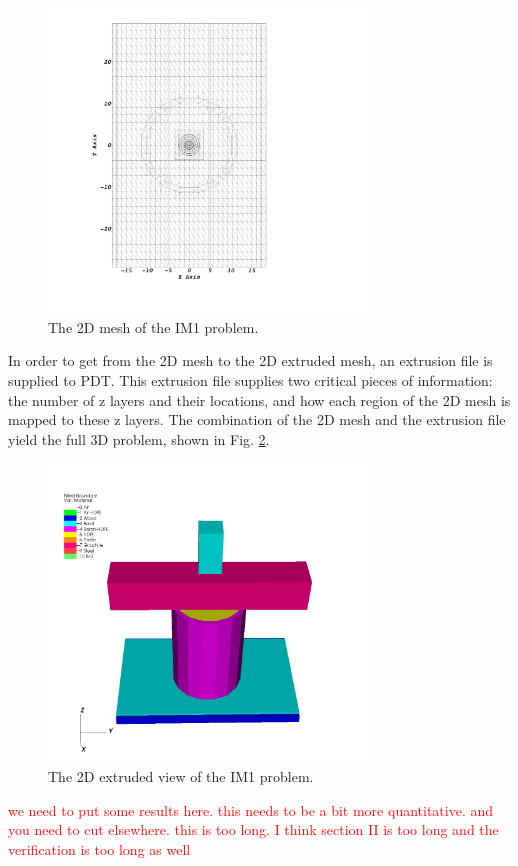 \documentclass{anstrans}
\newcommand{\tcr}[1]{\textcolor{red}{#1}}
\begin{document}
\begin{figure}
\centering
\includegraphics[width=85mm,trim= 4cm 5cm 0cm 5cm, clip]{figures/im12d.png}
\caption{The 2D mesh of the IM1 problem.}
\label{IM12D}
\end{figure}

In order to get from the 2D mesh to the 2D extruded mesh, an extrusion file is supplied to PDT. This extrusion file supplies two critical pieces of information: the number of z layers and their locations, and how each region of the 2D mesh is mapped to these z layers. The combination of the 2D mesh and the extrusion file yield the full 3D problem, shown in Fig. \ref{IM13D}.

\begin{figure}
\centering
\includegraphics[width=85mm,trim= 0cm 0cm 0cm 3cm, clip]{figures/IM1_3D.png}
\caption{The 2D extruded view of the IM1 problem.}
\label{IM13D}
\end{figure}

\tcr{we need to put some results here. this needs to be a bit more quantitative. and you need to cut elsewhere. this is too long. I think section II is too long and the verification is too long as well}
\end{document}
